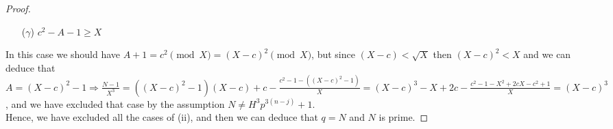 \documentclass[10pt,a4paper]{amsart}
\begin{document}
\begin{proof}
	\begin{enumerate}
		\item[($\gamma$)] $c^2-A-1 \ge X$
	\end{enumerate}
	In this case we should have $A+1=c^2 \pmod X = (X-c)^2 \pmod X$, but since $(X-c) < \sqrt{X}$ then $(X-c)^2 < X$ and we can deduce that $A=(X-c)^2-1 \Longrightarrow \frac{N-1}{X^3}= ((X-c)^2-1)(X-c) + c -\frac{c^2 -1 -((X-c)^2-1)}{X} = (X-c)^3 -X +2c - \frac{c^2 -1 -X^2 +2cX -c^2 +1}{X}= (X-c)^3$, and we have excluded that case by the assumption $N \neq H^3 p^{3(n-j)}+1$. 
	\\
	Hence, we have excluded all the cases of (ii), and then we can deduce that $q=N$ and $N$ is prime.
\end{proof}
\end{document}

